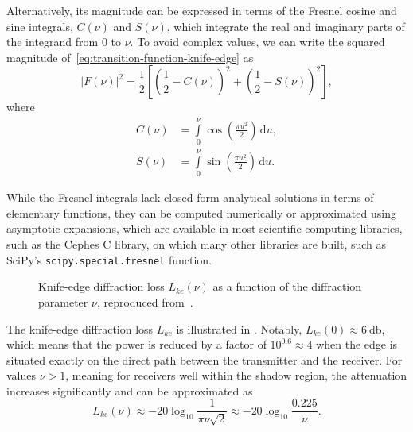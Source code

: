 Alternatively, its magnitude can be expressed in terms of the Fresnel cosine and sine integrals, $C(\nu)$ and $S(\nu)$, which integrate the real and imaginary parts of the integrand from $0$ to $\nu$. To avoid complex values, we can write the squared magnitude of~\eqref{eq:transition-function-knife-edge} as
\begin{equation}
  |F(\nu)|^2 = \frac{1}{2} \left[ \left(\frac{1}{2} - C(\nu)\right)^2 + \left(\frac{1}{2} - S(\nu)\right)^2 \right],
\end{equation}
where
\begin{align}
  C(\nu) &= \int\limits_{0}^{\nu} \cos\left(\frac{\pi u^2}{2}\right) \,\mathrm{d}u, \\
  S(\nu) &= \int\limits_{0}^{\nu} \sin\left(\frac{\pi u^2}{2}\right) \,\mathrm{d}u.
\end{align}

While the Fresnel integrals lack closed-form analytical solutions in terms of elementary functions, they can be computed numerically or approximated using asymptotic expansions, which are available in most scientific computing libraries, such as the Cephes C library, on which many other libraries are built, such as SciPy's \texttt{scipy.special.fresnel} function.

\begin{figure}
  \centering
  \caption{Knife-edge diffraction loss $L_{ke}(\nu)$ as a function of the diffraction parameter $\nu$, reproduced from~\cite[Fig.~3.15]{Saunders2024}.}
\end{figure}

The knife-edge diffraction loss $L_{ke}$ is illustrated in . Notably, $L_{ke}(0) \approx \qty{6}{\decibel}$, which means that the power is reduced by a factor of $10^{0.6} \approx 4$ when the edge is situated exactly on the direct path between the transmitter and the receiver. For values $\nu > 1$, meaning for receivers well within the \gls{shadow region}, the attenuation increases significantly and can be approximated as
\begin{equation}
  L_{ke}(\nu) \approx -20 \log_{10} \frac{1}{\pi \nu \sqrt{2}} \approx -20 \log_{10} \frac{0.225}{\nu}.
\end{equation}

